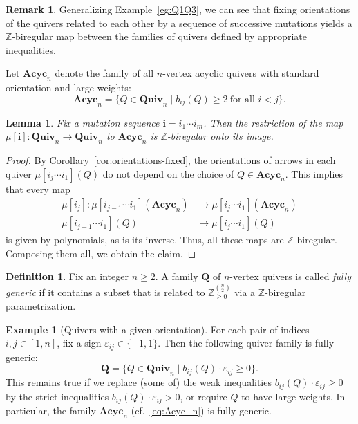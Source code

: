 \documentclass[11pt, letterpaper]{amsart}
\newtheorem{lemma}[theorem]{Lemma}
\theoremstyle{definition}
\newtheorem{remark}[theorem]{Remark}
\newtheorem{example}[theorem]{Example}
\newtheorem{definition}[theorem]{Definition}
\numberwithin{equation}{section}
\def\ZZ{{\mathbb Z}}
\def\Quiv {{\mathbf{Quiv}}}
\newcommand{\T}[2]{\mu[#1](#2)} %
\begin{document}
\begin{remark}
Generalizing Example~\ref{eg:Q1Q3}, we can see that fixing orientations of the quivers related to each other by 
a sequence of successive mutations yields a $\ZZ$-biregular map
between the families of quivers defined by appropriate inequalities. 
\end{remark}

Let $\mathbf{Acyc}_n$ denote the family of all $n$-vertex acyclic quivers 
with standard orientation and large weights:
\begin{equation}
\label{eq:Acyc_n}
\mathbf{Acyc}_n=\{Q\in\Quiv_n\mid b_{ij}(Q)\ge 2\ \text{for all $i<j$}\}. 
\end{equation}

\begin{lemma}
\label{lem:mut-acyclic-orientations}
Fix a mutation sequence $\mathbf{i}=i_1\cdots i_m$. 
Then the restriction of the map $\mu[\mathbf{i}]:\Quiv_n\to\Quiv_n$ to $\mathbf{Acyc}_n$
is $\ZZ$-biregular onto its image.
\end{lemma}

\begin{proof}
By Corollary~\ref{cor:orientations-fixed}, the orientations of arrows in each quiver $\T{i_j\cdots i_1}{Q}$
do not depend on the choice of $Q\in\mathbf{Acyc}_n$. 
This implies that every map 
\begin{align*}
\mu[i_j]:\T{i_{j-1} \cdots i_1}{\mathbf{Acyc}_n} &\longrightarrow \T{i_j\cdots i_1}{\mathbf{Acyc}_n} \\
 \T{i_{j-1}\cdots i_1}{Q} &\longmapsto\T{i_j\cdots i_1}{Q} 
\end{align*}
is given by polynomials, as is its inverse. 
Thus, all these maps are $\ZZ$-biregular. 
Composing them all, we obtain the claim. 
\end{proof}

\begin{definition}
\label{def:generic-quivers}
Fix an integer $n\ge 2$. 
A family $\mathbf{Q}$ of $n$-vertex quivers is called \emph{fully generic} if
it contains a subset that is related to $\ZZ_{\ge0}^{\binom{n} 2}$ via a $\ZZ$-biregular parametrization. 
\end{definition}

\begin{example}[Quivers with a given orientation]
\label{eg:fixed-orientation-generic}
For each pair of indices $i,j \in [1,n]$, fix a sign $\varepsilon_{ij}\in\{-1,1\}$. 
Then the following quiver family is fully generic: 
\begin{equation*}
\mathbf{Q}=\{Q\in\Quiv_n \mid b_{ij}(Q)\cdot\varepsilon_{ij}\ge 0\}. 
\end{equation*}
This remains true if we replace (some of) the weak inequalities $b_{ij}(Q)\cdot\varepsilon_{ij}\ge 0$ 
by the strict inequalities $b_{ij}(Q)\cdot\varepsilon_{ij}> 0$, 
or require $Q$ to have large weights. 
In particular, the family $\mathbf{Acyc}_n$ (cf.\ \eqref{eq:Acyc_n}) is fully generic. 
\end{example}
\end{document}
